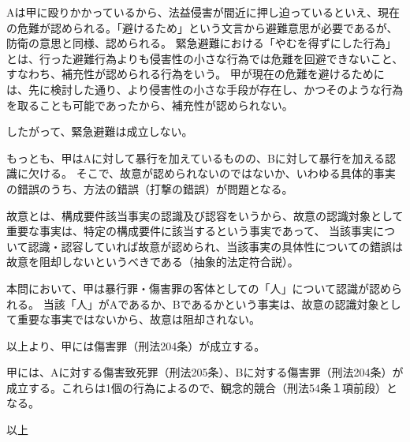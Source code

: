 \documentclass[11pt]{jsarticle}
\begin{document}
	Aは甲に殴りかかっているから、法益侵害が間近に押し迫っているといえ、現在の危難が認められる。「避けるため」という文言から避難意思が必要であるが、防衛の意思と同様、認められる。
	緊急避難における「やむを得ずにした行為」とは、行った避難行為よりも侵害性の小さな行為では危難を回避できないこと、すなわち、補充性が認められる行為をいう。
	甲が現在の危難を避けるためには、先に検討した通り、より侵害性の小さな手段が存在し、かつそのような行為を取ることも可能であったから、補充性が認められない。
	
	したがって、緊急避難は成立しない。
	
	\sectionB{}
	もっとも、甲はAに対して暴行を加えているものの、Bに対して暴行を加える認識に欠ける。
	そこで、故意が認められないのではないか、いわゆる具体的事実の錯誤のうち、方法の錯誤（打撃の錯誤）が問題となる。
	
	故意とは、構成要件該当事実の認識及び認容をいうから、故意の認識対象として重要な事実は、特定の構成要件に該当するという事実であって、
	当該事実について認識・認容していれば故意が認められ、当該事実の具体性についての錯誤は故意を阻却しないというべきである（抽象的法定符合説）。
	
	本問において、甲は暴行罪・傷害罪の客体としての「人」について認識が認められる。
	当該「人」がAであるか、Bであるかという事実は、故意の認識対象として重要な事実ではないから、故意は阻却されない。
	
	以上より、甲には傷害罪（刑法204条）が成立する。
	
	
	
	
	
	甲には、Aに対する傷害致死罪（刑法205条）、Bに対する傷害罪（刑法204条）が成立する。これらは1個の行為によるので、観念的競合（刑法54条１項前段）となる。





\begin{flushright}
	以上
\end{flushright}
	
\end{document}
